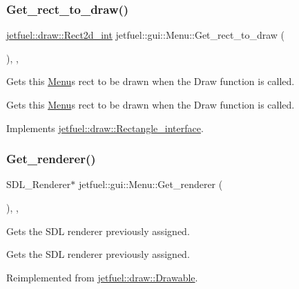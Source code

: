 \subsubsection{\texorpdfstring{Get\+\_\+rect\+\_\+to\+\_\+draw()}{Get\_rect\_to\_draw()}}
{\footnotesize\ttfamily \hyperlink{classjetfuel_1_1draw_1_1Rect2d}{jetfuel\+::draw\+::\+Rect2d\+\_\+int} jetfuel\+::gui\+::\+Menu\+::\+Get\+\_\+rect\+\_\+to\+\_\+draw (\begin{DoxyParamCaption}{ }\end{DoxyParamCaption})\hspace{0.3cm}{\ttfamily [inline]}, {\ttfamily [override]}, {\ttfamily [virtual]}}



Gets this \hyperlink{classjetfuel_1_1gui_1_1Menu}{Menu}\textquotesingle{}s rect to be drawn when the Draw function is called. 

Gets this \hyperlink{classjetfuel_1_1gui_1_1Menu}{Menu}\textquotesingle{}s rect to be drawn when the Draw function is called. 

Implements \hyperlink{classjetfuel_1_1draw_1_1Rectangle__interface_a03fd3b6842ab7b3065379caec407296f}{jetfuel\+::draw\+::\+Rectangle\+\_\+interface}.

\mbox{\label{classjetfuel_1_1gui_1_1Menu_a411940386454af4e44dc8c0c84c00215}} 
\subsubsection{\texorpdfstring{Get\+\_\+renderer()}{Get\_renderer()}}
{\footnotesize\ttfamily S\+D\+L\+\_\+\+Renderer$\ast$ jetfuel\+::gui\+::\+Menu\+::\+Get\+\_\+renderer (\begin{DoxyParamCaption}{ }\end{DoxyParamCaption})\hspace{0.3cm}{\ttfamily [inline]}, {\ttfamily [override]}, {\ttfamily [virtual]}}



Gets the S\+DL renderer previously assigned. 

Gets the S\+DL renderer previously assigned. 

Reimplemented from \hyperlink{classjetfuel_1_1draw_1_1Drawable_a6bbda81a7fbd33c388039ecaeb53c278}{jetfuel\+::draw\+::\+Drawable}.

